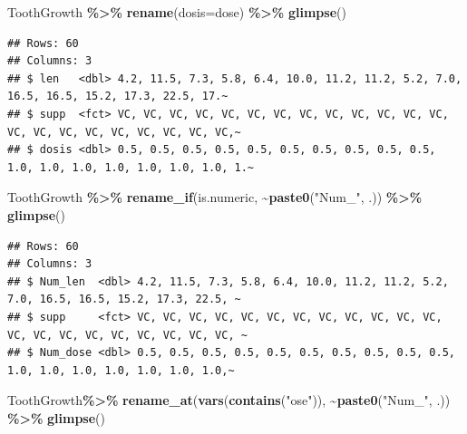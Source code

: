 \documentclass[
]{book}
\newenvironment{Shaded}{\begin{snugshade}}{\end{snugshade}}
\newcommand{\AttributeTok}[1]{\textcolor[rgb]{0.13,0.29,0.53}{#1}}
\newcommand{\FunctionTok}[1]{\textcolor[rgb]{0.13,0.29,0.53}{\textbf{#1}}}
\newcommand{\NormalTok}[1]{#1}
\newcommand{\SpecialCharTok}[1]{\textcolor[rgb]{0.81,0.36,0.00}{\textbf{#1}}}
\newcommand{\StringTok}[1]{\textcolor[rgb]{0.31,0.60,0.02}{#1}}
\begin{document}
\begin{Shaded}
\begin{Highlighting}[]
\NormalTok{ToothGrowth }\SpecialCharTok{\%\textgreater{}\%} \FunctionTok{rename}\NormalTok{(}\AttributeTok{dosis=}\NormalTok{dose) }\SpecialCharTok{\%\textgreater{}\%} \FunctionTok{glimpse}\NormalTok{()}
\end{Highlighting}
\end{Shaded}

\begin{verbatim}
## Rows: 60
## Columns: 3
## $ len   <dbl> 4.2, 11.5, 7.3, 5.8, 6.4, 10.0, 11.2, 11.2, 5.2, 7.0, 16.5, 16.5, 15.2, 17.3, 22.5, 17.~
## $ supp  <fct> VC, VC, VC, VC, VC, VC, VC, VC, VC, VC, VC, VC, VC, VC, VC, VC, VC, VC, VC, VC, VC, VC,~
## $ dosis <dbl> 0.5, 0.5, 0.5, 0.5, 0.5, 0.5, 0.5, 0.5, 0.5, 0.5, 1.0, 1.0, 1.0, 1.0, 1.0, 1.0, 1.0, 1.~
\end{verbatim}

\begin{Shaded}
\begin{Highlighting}[]
\NormalTok{ToothGrowth }\SpecialCharTok{\%\textgreater{}\%} \FunctionTok{rename\_if}\NormalTok{(is.numeric, }\SpecialCharTok{\textasciitilde{}}\FunctionTok{paste0}\NormalTok{(}\StringTok{"Num\_"}\NormalTok{, .)) }\SpecialCharTok{\%\textgreater{}\%} \FunctionTok{glimpse}\NormalTok{()}
\end{Highlighting}
\end{Shaded}

\begin{verbatim}
## Rows: 60
## Columns: 3
## $ Num_len  <dbl> 4.2, 11.5, 7.3, 5.8, 6.4, 10.0, 11.2, 11.2, 5.2, 7.0, 16.5, 16.5, 15.2, 17.3, 22.5, ~
## $ supp     <fct> VC, VC, VC, VC, VC, VC, VC, VC, VC, VC, VC, VC, VC, VC, VC, VC, VC, VC, VC, VC, VC, ~
## $ Num_dose <dbl> 0.5, 0.5, 0.5, 0.5, 0.5, 0.5, 0.5, 0.5, 0.5, 0.5, 1.0, 1.0, 1.0, 1.0, 1.0, 1.0, 1.0,~
\end{verbatim}

\begin{Shaded}
\begin{Highlighting}[]
\NormalTok{ToothGrowth}\SpecialCharTok{\%\textgreater{}\%} \FunctionTok{rename\_at}\NormalTok{(}\FunctionTok{vars}\NormalTok{(}\FunctionTok{contains}\NormalTok{(}\StringTok{"ose"}\NormalTok{)), }\SpecialCharTok{\textasciitilde{}}\FunctionTok{paste0}\NormalTok{(}\StringTok{"Num\_"}\NormalTok{, .)) }\SpecialCharTok{\%\textgreater{}\%} \FunctionTok{glimpse}\NormalTok{()}
\end{Highlighting}
\end{Shaded}
\end{document}
